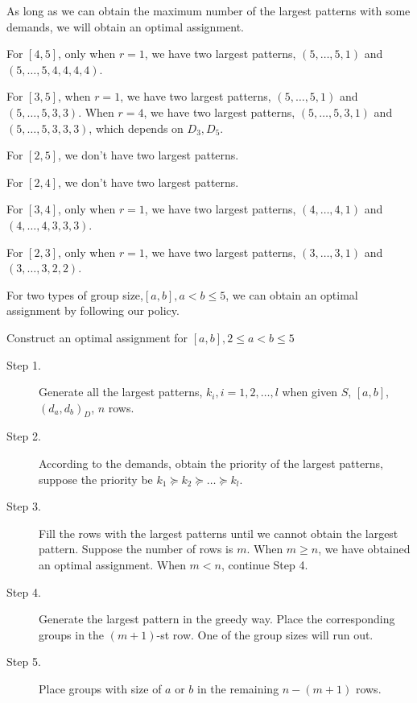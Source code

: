 As long as we can obtain the maximum number of the largest patterns with some demands, we will obtain an optimal assignment.

\begin{lem}
For $[4,5]$, only when $r=1$, we have two largest patterns,
  $(5,\ldots,5,1)$ and $(5,\ldots,5,4,4,4,4)$.

For $[3,5]$, when $r=1$, we have two largest patterns, $(5,\ldots,5,1)$ and $(5,\ldots,5,3,3)$. When $r=4$, we have two largest patterns, $(5,\ldots,5,3,1)$ and $(5,\ldots,5,3,3,3)$, which depends on $D_3,D_5$.

For $[2,5]$, we don't have two largest patterns.

For $[2,4]$, we don't have two largest patterns.

For $[3,4]$, only when $r=1$, we have two largest patterns, $(4,\ldots,4,1)$ and $(4,\ldots,4,3,3,3)$.

For $[2,3]$, only when $r=1$, we have two largest patterns, $(3,\ldots,3,1)$ and $(3,\ldots,3,2,2)$.
\end{lem}

\begin{thm}
For two types of group size,$[a,b], a < b \leq 5$, we can obtain an optimal assignment by following our policy.
\end{thm}

\begin{algorithm}[H]\label{algo2}
\caption{Construct an optimal assignment for $[a,b], 2 \leq a<b \leq 5$}
\begin{description}
  \item[Step 1.] Generate all the largest patterns, $k_i,i=1,2,\ldots,l$ when given $S$, $[a,b]$, $(d_a,d_b)_D$, $n$ rows.
  \vspace{10pt}
  \item[Step 2.] According to the demands, obtain the priority of the largest patterns, suppose the priority be $k_1 \succeq k_2 \succeq \ldots \succeq k_l$.
	\vspace{10pt}
  \item[Step 3.] Fill the rows with the largest patterns until we cannot obtain the largest pattern. Suppose the number of rows is $m$. When $m \geq n$, we have obtained an optimal assignment. When $m <n$, continue Step 4.
  \item[Step 4.] Generate the largest pattern in the greedy way. Place the corresponding groups in the $(m+1)$-st row. One of the group sizes will run out.
  \item[Step 5.] Place groups with size of $a$ or $b$ in the remaining $n-(m+1)$ rows.
\end{description}
\end{algorithm}


